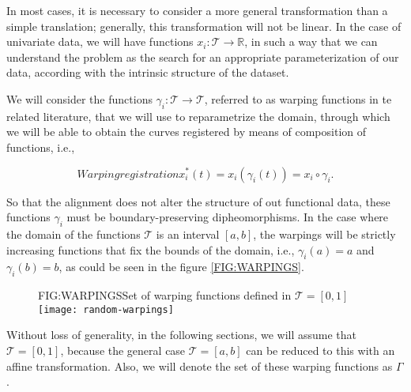 In most cases, it is necessary to consider a more general transformation than a
simple translation; generally, this transformation will not be linear. In the
case of univariate data, we will have functions
$x_i: \mathcal{T} \rightarrow \mathbb{R}$, in such a way that we can understand
the problem as the search for an appropriate parameterization of our data,
according with the intrinsic structure of the dataset.

We will consider the functions $\gamma_i: \mathcal{T} \rightarrow \mathcal{T}$,
referred to as warping functions in te related literature, that we will use to reparametrize the domain, through which we will be able to
obtain the curves registered by means of composition of functions, i.e.,

\begin{equation}[]{Warping registration}
x_i^*(t)=x_i(\gamma_i(t)) = x_i \circ \gamma _i.
\end{equation}

So that the alignment does not alter the structure of out functional data,
these functions $\gamma_i$ must be boundary-preserving dipheomorphisms. In the
case where the domain of the functions $\mathcal{T}$ is an interval $[a,b]$, the
warpings will be strictly increasing functions that fix the bounds of the
domain, i.e., $\gamma_i(a)=a$ and $\gamma_i(b)=b$, as could be seen in the
figure \ref{FIG:WARPINGS}.

\begin{figure}[Set of warping functions]{FIG:WARPINGS}{Set of warping functions defined in $\mathcal{T}=[0,1]$}
  \texttt{[image: random-warpings]}
\end{figure}


Without loss of generality, in the following sections, we
will assume that $\mathcal{T}=[0,1]$, because the general case
$\mathcal{T}=[a,b]$ can be reduced to this with an affine transformation. Also,
we will denote the set of these warping functions as $\Gamma$.
